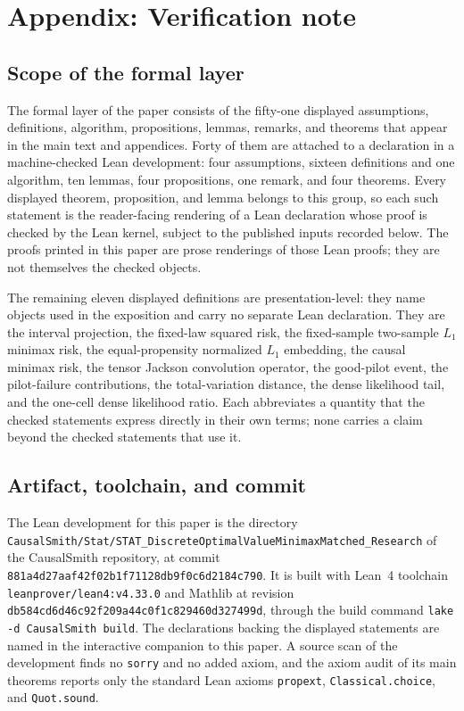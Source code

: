 \section{Appendix: Verification note}

\subsection*{Scope of the formal layer}

The formal layer of the paper consists of the fifty-one displayed assumptions, definitions, algorithm, propositions, lemmas, remarks, and theorems that appear in the main text and appendices. Forty of them are attached to a declaration in a machine-checked Lean development: four assumptions, sixteen definitions and one algorithm, ten lemmas, four propositions, one remark, and four theorems. Every displayed theorem, proposition, and lemma belongs to this group, so each such statement is the reader-facing rendering of a Lean declaration whose proof is checked by the Lean kernel, subject to the published inputs recorded below. The proofs printed in this paper are prose renderings of those Lean proofs; they are not themselves the checked objects.

The remaining eleven displayed definitions are presentation-level: they name objects used in the exposition and carry no separate Lean declaration. They are the interval projection, the fixed-law squared risk, the fixed-sample two-sample \(L_1\) minimax risk, the equal-propensity normalized \(L_1\) embedding, the causal minimax risk, the tensor Jackson convolution operator, the good-pilot event, the pilot-failure contributions, the total-variation distance, the dense likelihood tail, and the one-cell dense likelihood ratio. Each abbreviates a quantity that the checked statements express directly in their own terms; none carries a claim beyond the checked statements that use it.

\subsection*{Artifact, toolchain, and commit}

The Lean development for this paper is the directory \texttt{CausalSmith/Stat/STAT\_DiscreteOptimalValueMinimaxMatched\_Research} of the CausalSmith repository, at commit \texttt{881a4d27aaf42f02b1f71128db9f0c6d2184c790}. It is built with Lean~4 toolchain \texttt{leanprover/lean4:v4.33.0} and Mathlib at revision \texttt{db584cd6d46c92f209a44c0f1c829460d327499d}, through the build command \texttt{lake -d CausalSmith build}. The declarations backing the displayed statements are named in the interactive companion to this paper. A source scan of the development finds no \texttt{sorry} and no added axiom, and the axiom audit of its main theorems reports only the standard Lean axioms \texttt{propext}, \texttt{Classical.choice}, and \texttt{Quot.sound}.

